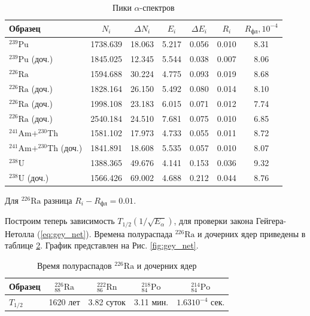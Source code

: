 \documentclass[11.5pt,a4paper,russian]{article}
\begin{document}
\begin{table}[h!]
  \centering
  \caption{Пики $\alpha$-спектров}
\begin{tabular}{l|c|c|c|c|c|c}
\toprule 
Образец & $N_i$ & $\Delta N_i$ & $E_i$ & $\Delta E_i$ & $R_i$ & $R_\text{фл}, 10^{-4}$ \\
\midrule ${ }^{239} \mathrm{Pu}$ & 1738.639 & 18.063 & 5.217 & 0.056 & 0.010 & 8.31 \\
${ }^{239} \mathrm{Pu}$ (доч.) & 1845.025 & 12.345 & 5.544 & 0.038 & 0.007 & 8.06 \\
${ }^{226} \mathrm{Ra}$ & 1594.688 & 30.224 & 4.775 & 0.093 & 0.019 & 8.68 \\
${ }^{226} \mathrm{Ra}$ (доч.) & 1828.164 & 26.150 & 5.492 & 0.080 & 0.014 & 8.10 \\
${ }^{226} \mathrm{Ra}$ (доч.) & 1998.108 & 23.183 & 6.015 & 0.071 & 0.012 & 7.74 \\
${ }^{226} \mathrm{Ra}$ (доч.) & 2540.184 & 24.510 & 7.681 & 0.075 & 0.010 & 6.85 \\
${ }^{241} \mathrm{Am} + ^{230} \mathrm{Th}$ & 1581.102 & 17.973 & 4.733 & 0.055 & 0.011 & 8.72 \\
${ }^{241} \mathrm{Am} + ^{230} \mathrm{Th}$ (доч.) & 1841.891 & 18.608 & 5.535 & 0.057 & 0.010 & 8.07 \\
${ }^{238} \mathrm{U}$ & 1388.365 & 49.676 & 4.141 & 0.153 & 0.036 & 9.32 \\
${ }^{238} \mathrm{U}$ (доч.) & 1566.426 & 69.002 & 4.688 & 0.212 & 0.044 & 8.76 \\
\bottomrule
\end{tabular}
  \label{table:energy}
\end{table}

Для ${ }^{226} \mathrm{Ra}$ разница $R_i - R_\text{фл} = 0.01$.

Построим теперь зависимость $T_{1/2}(1/\sqrt{E_\alpha})$, для проверки закона Гейгера-Нетолла (\ref{eq:gey_net}). Времена полураспада ${ }^{226} \mathrm{Ra}$ и дочерних ядер приведены в таблице \ref{table:gey_net}. График представлен на Рис. \ref{fig:gey_net}.

\begin{table}[h!]
\centering
\caption{Время полураспадов ${ }^{226} \mathrm{Ra}$ и дочерних ядер}
\label{table:gey_net}
\begin{tabular}{l|c|c|c|c}
\toprule
Образец & ${ }^{226}_{88} \mathrm{Ra}$ & ${ }^{222}_{86} \mathrm{Rn}$ & ${ }^{218}_{84} \mathrm{Po}$ & ${ }^{214}_{84} \mathrm{Po}$ \\
\midrule
    $T_{1/2}$ & 1620 лет & 3.82 суток & 3.11 мин. & $1.63 10^{-4}$ сек. \\
\bottomrule
\end{tabular}
\end{table}
\end{document}
